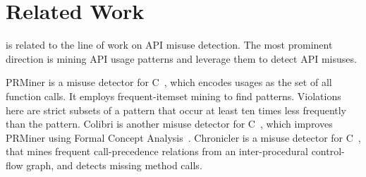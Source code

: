 \section{Related Work}
\label{sec: related}

{\tool} is related to the line of work on API misuse detection.
The most prominent direction is mining API usage patterns
and leverage them to detect API misuses.

PRMiner is a misuse detector for C~\cite{LZ05}, which encodes usages
as the set of all function calls. It employs frequent-itemset mining
to find patterns. Violations here are strict subsets of a pattern that
occur at least ten times less frequently than the pattern. Colibri is
another misuse detector for C~\cite{L07}, which improves PRMiner using
Formal Concept Analysis~\cite{GW99}. Chronicler is a misuse detector
for C~\cite{RGJ07b}, that mines frequent call-precedence relations
from an inter-procedural control-flow graph, and detects missing
method calls.

